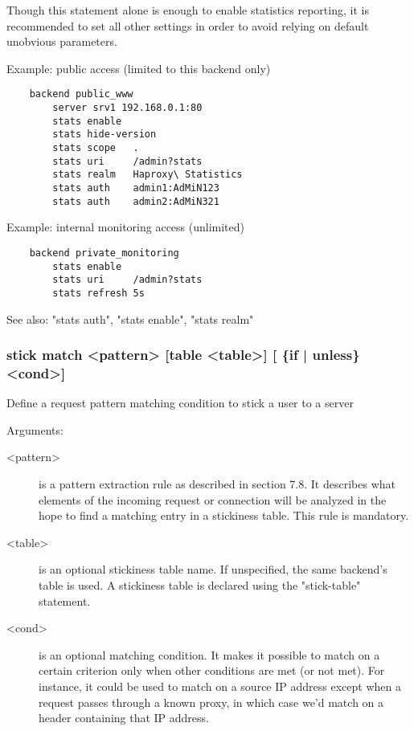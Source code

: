   Though this statement alone is enough to enable statistics reporting, it is
  recommended to set all other settings in order to avoid relying on default
  unobvious parameters.

  Example: public access (limited to this backend only)
  \begin{verbatim}
    backend public_www
        server srv1 192.168.0.1:80
        stats enable
        stats hide-version
        stats scope   .
        stats uri     /admin?stats
        stats realm   Haproxy\ Statistics
        stats auth    admin1:AdMiN123
        stats auth    admin2:AdMiN321
  \end{verbatim}

  Example: internal monitoring access (unlimited)
  \begin{verbatim}
    backend private_monitoring
        stats enable
        stats uri     /admin?stats
        stats refresh 5s
  \end{verbatim}

  See also: "stats auth", "stats enable", "stats realm"

\subsubsection[stick match]{stick match <pattern> [table <table>] [ \{if | unless\} <cond>]}


  Define a request pattern matching condition to stick a user to a server


  Arguments:
  \begin{description}
  \item[<pattern>] is a pattern extraction rule as described in section 7.8. It
               describes what elements of the incoming request or connection
               will be analyzed in the hope to find a matching entry in a
               stickiness table. This rule is mandatory.

  \item[<table>] is an optional stickiness table name. If unspecified, the same
               backend's table is used. A stickiness table is declared using
               the "stick-table" statement.

  \item[<cond>] is an optional matching condition. It makes it possible to match
               on a certain criterion only when other conditions are met (or
               not met). For instance, it could be used to match on a source IP
               address except when a request passes through a known proxy, in
               which case we'd match on a header containing that IP address.
  \end{description}

